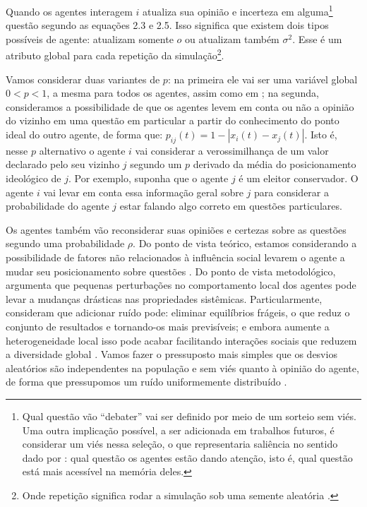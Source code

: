 Quando os agentes interagem \(i\) atualiza sua opinião e incerteza em
alguma\footnote{Qual questão vão ``debater'' vai ser definido por meio de um
  sorteio sem viés. Uma outra implicação possível, a ser adicionada em trabalhos
  futuros, é considerar um viés nessa seleção, o que representaria saliência no
  sentido dado por : qual questão os agentes estão
  dando atenção, isto é, qual questão está mais acessível na memória deles.}
questão segundo as equações 2.3 e 2.5. Isso significa que existem dois tipos
possíveis de agente: atualizam somente \(o\) ou atualizam também \(\sigma^2\). Esse é
um atributo global para cada repetição da simulação\footnote{Onde repetição
  significa rodar a simulação sob uma semente aleatória \cite{laver2011party}.}.


Vamos considerar duas variantes de \(p\): na primeira ele vai ser uma variável
global \(0 < p < 1 \), a mesma para todos os agentes, assim como em
; na segunda, consideramos a possibilidade de
que os agentes levem em conta ou não a opinião do vizinho em uma questão em
particular a partir do conhecimento do ponto ideal do outro agente, de forma
que: \(p_{ij}(t) = 1 - |x_i(t) - x_j(t)|\). Isto é, nesse \(p\) alternativo o
agente \(i\) vai considerar a verossimilhança de um valor declarado pelo seu
vizinho \(j\) segundo um \(p\) derivado da média do posicionamento ideológico de
\(j\). Por exemplo, suponha que o agente \(j\) é um eleitor conservador. O
agente \(i\) vai levar em conta essa informação geral sobre \(j\) para
considerar a probabilidade do agente \(j\) estar falando algo correto em
questões particulares.

Os agentes também vão reconsiderar suas opiniões e certezas sobre as questões
segundo uma probabilidade \(\rho\). Do ponto de vista teórico, estamos considerando
a possibilidade de fatores não relacionados à influência social levarem o agente
a mudar seu posicionamento sobre questões \cite{flache2017, lorenz2017modeling}.
Do ponto de vista metodológico,  argumenta que
pequenas perturbações no comportamento local dos agentes pode levar a mudanças
drásticas nas propriedades sistêmicas. Particularmente, consideram que adicionar
ruído pode: eliminar equilíbrios frágeis, o que reduz o conjunto de resultados e
tornando-os mais previsíveis; e embora aumente a heterogeneidade local isso pode
acabar facilitando interações sociais que reduzem a diversidade global
\cite[p.323]{macy2015signal}. Vamos fazer o pressuposto mais simples que os
desvios aleatórios são independentes na população e sem viés quanto à opinião do
agente, de forma que pressupomos um ruído uniformemente distribuído
\cite{Pineda-2009, lorenz2017modeling}.


